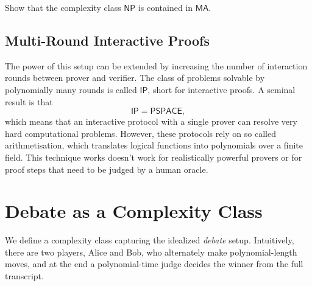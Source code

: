 \documentclass[11pt]{article}
\newcommand{\SNP}{\mathsf{NP}}
\begin{document}


\begin{exercise}
\label{ex:ex1}
 Show that the complexity class $\SNP$ is contained in $\mathsf{MA}$.
\end{exercise}

\subsection{Multi-Round Interactive Proofs}

The power of this setup can be extended by increasing the number of interaction rounds between prover and verifier. The class of problems solvable by polynomially many rounds is called $\mathsf{IP}$, short for interactive proofs. A seminal result is that 
\[
 \mathsf{IP} = \mathsf{PSPACE},
\]
which means that an interactive protocol with a single prover can resolve very hard computational problems. However, these protocols rely on so called arithmetisation, which translates logical functions into polynomials over a finite field. This technique works doesn't work for realistically powerful provers or for proof steps that need to be judged by a human oracle.


\section{Debate as a Complexity Class}

We define a complexity class capturing the idealized \emph{debate} setup. Intuitively, there are two players, Alice and Bob, who alternately make polynomial-length moves, and at the end a polynomial-time judge decides the winner from the full transcript.
\end{document}
